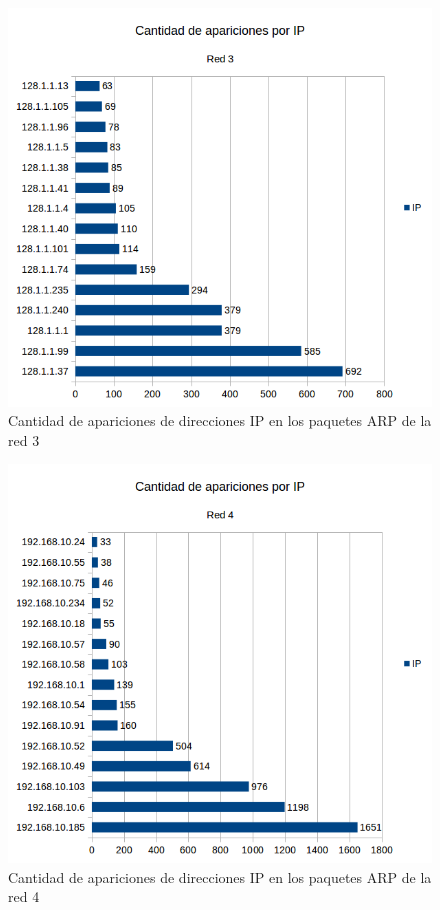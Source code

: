 \begin{figure}[H]
	\centering
	\includegraphics[scale=0.65]{imgs/red3_identificar.png}
	\caption{Cantidad de apariciones de direcciones IP en los paquetes ARP de la red 3}
      \label{red3_identificar}
\end{figure}

\begin{figure}[H]
	\centering
	\includegraphics[scale=0.65]{imgs/red4_identificar.png}
	\caption{Cantidad de apariciones de direcciones IP en los paquetes ARP de la red 4}
      \label{red4_identificar}
\end{figure}